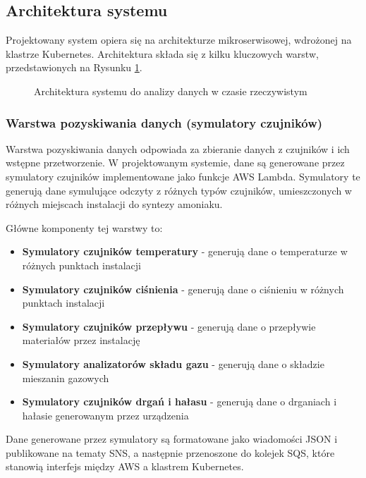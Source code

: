 \subsection{Architektura systemu}
\label{subsec:architektura}

Projektowany system opiera się na architekturze mikroserwisowej, wdrożonej na klastrze Kubernetes. Architektura składa się z kilku kluczowych warstw, przedstawionych na Rysunku \ref{fig:architektura_systemu}.

\begin{figure}[h]
    \centering
    \caption{Architektura systemu do analizy danych w czasie rzeczywistym}
    \label{fig:architektura_systemu}
\end{figure}

\subsubsection{Warstwa pozyskiwania danych (symulatory czujników)}
\label{subsubsec:warstwa_pozyskiwania}

Warstwa pozyskiwania danych odpowiada za zbieranie danych z czujników i ich wstępne przetworzenie. W projektowanym systemie, dane są generowane przez symulatory czujników implementowane jako funkcje AWS Lambda. Symulatory te generują dane symulujące odczyty z różnych typów czujników, umieszczonych w różnych miejscach instalacji do syntezy amoniaku.

Główne komponenty tej warstwy to:

\begin{itemize}
    \item \textbf{Symulatory czujników temperatury} - generują dane o temperaturze w różnych punktach instalacji
    \item \textbf{Symulatory czujników ciśnienia} - generują dane o ciśnieniu w różnych punktach instalacji
    \item \textbf{Symulatory czujników przepływu} - generują dane o przepływie materiałów przez instalację
    \item \textbf{Symulatory analizatorów składu gazu} - generują dane o składzie mieszanin gazowych
    \item \textbf{Symulatory czujników drgań i hałasu} - generują dane o drganiach i hałasie generowanym przez urządzenia
\end{itemize}

Dane generowane przez symulatory są formatowane jako wiadomości JSON i publikowane na tematy SNS, a następnie przenoszone do kolejek SQS, które stanowią interfejs między AWS a klastrem Kubernetes.

